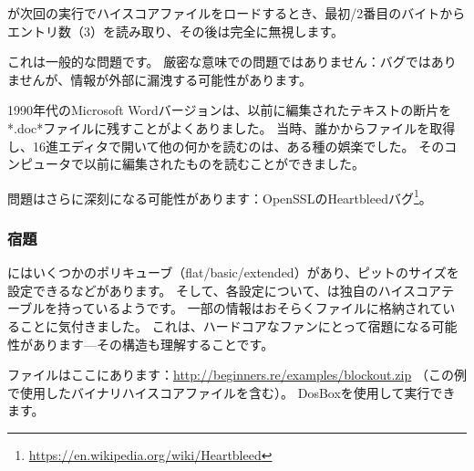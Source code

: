 が次回の実行でハイスコアファイルをロードするとき、最初/2番目のバイトからエントリ数（3）を読み取り、その後は完全に無視します。

これは一般的な問題です。
厳密な意味での問題ではありません：バグではありませんが、情報が外部に漏洩する可能性があります。

1990年代のMicrosoft Wordバージョンは、以前に編集されたテキストの断片を*.doc*ファイルに残すことがよくありました。
当時、誰かからファイルを取得し、16進エディタで開いて他の何かを読むのは、ある種の娯楽でした。
そのコンピュータで以前に編集されたものを読むことができました。

問題はさらに深刻になる可能性があります：OpenSSLのHeartbleedバグ\footnote{\url{https://en.wikipedia.org/wiki/Heartbleed}}。

\subsubsection{宿題}

にはいくつかのポリキューブ（flat/basic/extended）があり、ピットのサイズを設定できるなどがあります。
そして、各設定について、は独自のハイスコアテーブルを持っているようです。
一部の情報はおそらくファイルに格納されていることに気付きました。
これは、ハードコアなファンにとって宿題になる可能性があります---その構造も理解することです。

ファイルはここにあります：\url{http://beginners.re/examples/blockout.zip}
（この例で使用したバイナリハイスコアファイルを含む）。
DosBoxを使用して実行できます。